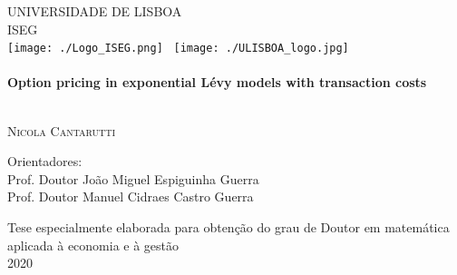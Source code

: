 \begin{titlepage}
\begin{center}



\textsc{\Large UNIVERSIDADE DE LISBOA}\\[0.5cm]
\textsc{\Large ISEG}\\[1cm]

\texttt{[image: ./Logo\_ISEG.png]}~
\texttt{[image: ./ULISBOA\_logo.jpg]}~
\\[1cm]

\HRule \\[0.4cm]
{ \huge \bfseries Option pricing in exponential Lévy models with transaction costs \\[0.4cm] }

\HRule \\[1.5cm]


\textsc{\LARGE Nicola Cantarutti}\\[1.5cm]


\noindent
\begin{flushleft} \large
Orientadores:\\[0.2cm]
Prof. Doutor João Miguel Espiguinha Guerra\\
Prof. Doutor Manuel Cidraes Castro Guerra\\
\end{flushleft}


\vfill

{Tese especialmente elaborada para obtenção do grau de Doutor em matemática aplicada à economia e à gestão}\\[2cm]

{\large 2020}\\[0.3cm]

\end{center}
\end{titlepage}